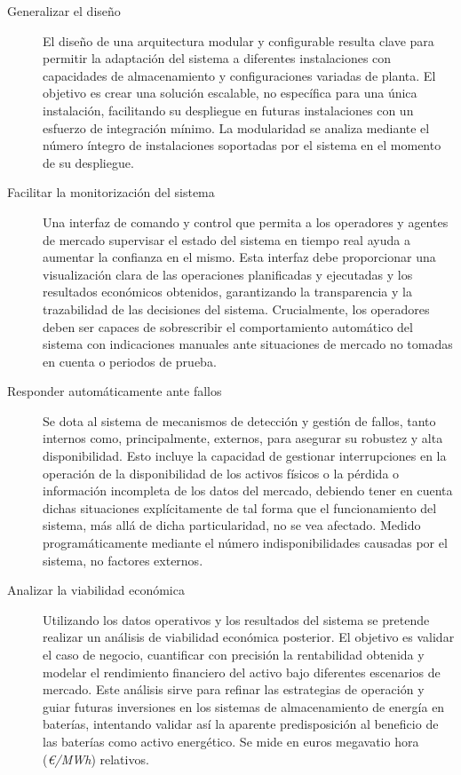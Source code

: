 \begin{description}
\item[Generalizar el diseño] El diseño de una arquitectura modular y configurable resulta clave para permitir la adaptación del sistema a diferentes instalaciones con capacidades de almacenamiento y configuraciones variadas de planta. El objetivo es crear una solución escalable, no específica para una única instalación, facilitando su despliegue en futuras instalaciones con un esfuerzo de integración mínimo. La modularidad se analiza mediante el número íntegro de instalaciones soportadas por el sistema en el momento de su despliegue.

\item[Facilitar la monitorización del sistema] Una interfaz de comando y control que permita a los operadores y agentes de mercado supervisar el estado del sistema en tiempo real ayuda a aumentar la confianza en el mismo. Esta interfaz debe proporcionar una visualización clara de las operaciones planificadas y ejecutadas y los resultados económicos obtenidos, garantizando la transparencia y la trazabilidad de las decisiones del sistema. Crucialmente, los operadores deben ser capaces de sobrescribir el comportamiento automático del sistema con indicaciones manuales ante situaciones de mercado no tomadas en cuenta o periodos de prueba.

\item[Responder automáticamente ante fallos] Se dota al sistema de mecanismos de detección y gestión de fallos, tanto internos como, principalmente, externos, para asegurar su robustez y alta disponibilidad. Esto incluye la capacidad de gestionar interrupciones en la operación de la disponibilidad de los activos físicos o la pérdida o información incompleta de los datos del mercado, debiendo tener en cuenta dichas situaciones explícitamente de tal forma que el funcionamiento del sistema, más allá de dicha particularidad, no se vea afectado. Medido programáticamente mediante el número indisponibilidades causadas por el sistema, no factores externos.

\item[Analizar la viabilidad económica] Utilizando los datos operativos y los resultados del sistema se pretende realizar un análisis de viabilidad económica posterior. El objetivo es validar el caso de negocio, cuantificar con precisión la rentabilidad obtenida y modelar el rendimiento financiero del activo bajo diferentes escenarios de mercado. Este análisis sirve para refinar las estrategias de operación y guiar futuras inversiones en los sistemas de almacenamiento de energía en baterías, intentando validar así la aparente predisposición al beneficio de las baterías como activo energético. Se mide en euros megavatio hora (\textit{€/MWh}) relativos.

\end{description}

